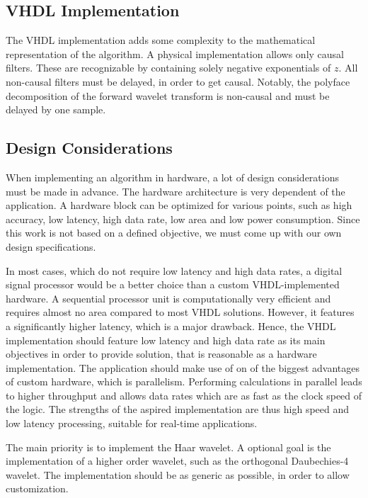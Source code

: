 \begin{refsection}
\section{VHDL Implementation}

The VHDL implementation adds some complexity to the mathematical representation of the algorithm.
A physical implementation allows only causal filters.
These are recognizable by containing solely negative exponentials of $z$.
All non-causal filters must be delayed, in order to get causal.
Notably, the polyface decomposition of the forward wavelet transform is non-causal and must be delayed by one sample.

\subsection{Design Considerations}

When implementing an algorithm in hardware, a lot of design considerations must be made in advance.
The hardware architecture is very dependent of the application.
A hardware block can be optimized for various points, such as high accuracy, low latency, high data rate, low area and low power consumption.
Since this work is not based on a defined objective, we must come up with our own design specifications.

In most cases, which do not require low latency and high data rates, a digital signal processor would be a better choice than a custom VHDL-implemented hardware.
A sequential processor unit is computationally very efficient and requires almost no area compared to most VHDL solutions.
However, it features a significantly higher latency, which is a major drawback.
Hence, the VHDL implementation should feature low latency and high data rate as its main objectives in order to provide solution, that is reasonable as a hardware implementation.
The application should make use of on of the biggest advantages of custom hardware, which is parallelism.
Performing calculations in parallel leads to higher throughput and allows data rates which are as fast as the clock speed of the logic.
The strengths of the aspired implementation are thus high speed and low latency processing, suitable for real-time applications.

The main priority is to implement the Haar wavelet.
A optional goal is the implementation of a higher order wavelet, such as the orthogonal Daubechies-4 wavelet.
The implementation should be as generic as possible, in order to allow customization.


\end{refsection}

